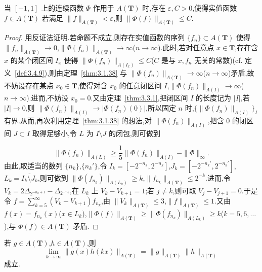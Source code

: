 \begin{lemma}\label{lem:3.5.4}
当 $[-1, 1]$ 上的连续函数 $\Phi$ 作用于 $A(\mathbf{T})$ 时,存在 $\varepsilon, C > 0$,使得实值函数 $f \in A(\mathbf{T})$ 若满足 $\|f\|_{A(\mathbf{T})} < \varepsilon$,则 $\|\Phi(f)\|_{A(\mathbf{T})} \leq C$.
\end{lemma}

\begin{proof}
\begin{sloppypar}
用反证法证明.若命题不成立,则存在实值函数的序列 $\{f_{n}\} \subset A(\mathbf{T})$ 使得 $\|f_{n}\|_{A(\mathbf{T})} \to 0$,$\|\Phi(f_{n})\|_{A(\mathbf{T})} \to \infty$($n \to \infty$).此时,若对任意点 $x \in \mathbf{T}$,存在含 $x$ 的某个闭区间 $I_{x}$ 使得 $\|\Phi(f_{n})\|_{A(I_{x})} \leq C$($C$ 是与 $x, f_{n}$ 无关的常数)(cf. 定义~\ref{def:3.4.9}),则由定理~\ref{thm:3.1.38} 与 $\|\Phi(f_{n})\|_{A(\mathbf{T})} \to \infty$($n \to \infty$)矛盾,故不妨设存在某点 $x_{0} \in \mathbf{T}$,使得对含 $x_{0}$ 的任意闭区间 $I$,$\|\Phi(f_{n})\|_{A(I)} \to \infty$($n \to \infty$).进而,不妨设 $x_{0} = 0$.又由定理~\ref{thm:3.3.1},把闭区间 $I$ 的长度记为 $|I|$,若 $|I| \to 0$,则 $\|\Phi(f_{n})\|_{A(I)} \to |\Phi(f_{n})(0)|$,所以固定 $n$ 时,$\{\|\Phi(f_{n})\|_{A(I)}\}_{I}$ 有界.从而,再次利用定理~\ref{thm:3.1.38} 的想法,对 $\|\Phi(f_{n})\|_{A(I)}$,把含 0 的闭区间 $J \subset I$ 取得足够小,令 $L$ 为 $I \setminus J$ 的闭包,则可做到
\end{sloppypar}
\begin{equation*}
\|\Phi(f_{n})\|_{A(L)} \geq \frac{1}{5}\|\Phi(f_{n})\|_{A(I)} - \|\Phi\|_{\infty}.
\end{equation*}
由此,取适当的数列 $\{n_{k}\}$,$\{n_{k}'\}$,令 $I_{k} = [-2^{-n_{k}}, 2^{-n_{k}}]$,$J_{k} = [-2^{-n_{k}'}, 2^{-n_{k}'}]$,$L_{k} = \overline{I_{k} \setminus J_{k}}$,则可做到 $\|\Phi(f_{n_{k}})\|_{A(L_{k})} \geq k$,$\|f_{n_{k}}\|_{A(\mathbf{T})} \leq 2^{-k}$.进而,令 $V_{k} = 2\Delta_{2^{-n_{k}+1}} - \Delta_{2^{-n_{k}}}$,在 $L_{k}$ 上 $V_{k} - V_{k+1} = 1$;若 $j \neq k$,则可取 $V_{j} - V_{j+1} = 0$.于是令 $f = \sum_{k=5}^{\infty}(V_{k} - V_{k+1})f_{n_{k}}$,由 $\|V_{k}\|_{A(\mathbf{T})} \leq 3$,$\|f\|_{A(\mathbf{T})} \leq 1$.又由 $f(x) = f_{n_{k}}(x)$($x \in L_{k}$),$\|\Phi(f)\|_{A(\mathbf{T})} \geq \|\Phi(f_{n_{k}})\|_{A(L_{k})} \geq k$($k = 5, 6, \ldots$),与 $\Phi(f) \in A(\mathbf{T})$ 矛盾.
\end{proof}

\begin{lemma}\label{lem:3.5.5}
若 $g \in A(\mathbf{T})$,$h \in A(\mathbf{T})$,则
\begin{equation*}
\lim_{k \to \infty}\|g(x)h(kx)\|_{A(\mathbf{T})} = \|g\|_{A(\mathbf{T})}\|h\|_{A(\mathbf{T})}
\end{equation*}
成立.
\end{lemma}

